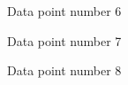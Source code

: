 \documentclass{article}
\begin{document}
\begin{figure}
\centering
{}
\caption{Data point number 6} \label{fig:q166}
\end{figure}

\begin{figure}
\centering
{}
\caption{Data point number 7} \label{fig:q167}
\end{figure}

\begin{figure}
\centering
{}
\caption{Data point number 8} \label{fig:q168}
\end{figure}
\end{document}

